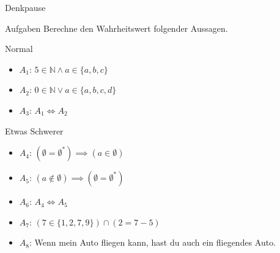 {
\begin{frame}[fragile]{Denkpause}
    \begin{alertblock}{Aufgaben}
      Berechne den Wahrheitswert folgender Aussagen. 
    \end{alertblock}
    \begin{block}{Normal}
    \begin{itemize}
        \item $A_1$: $5 \in \mathbb{N} \wedge a \in \{a, b, c\}$
        \item $A_2$: $0 \in \mathbb{N} \vee a \in \{a, b, c, d\}$
        \item $A_3$: $A_1 \iff A_2$
    \end{itemize}
    \end{block}
    \begin{block}{Etwas Schwerer}
    \begin{itemize}
        \item $A_4$: $(\emptyset=\emptyset^{*}) \implies (a \in \emptyset)$
        \item $A_5$: $(a \notin \emptyset) \implies (\emptyset = \emptyset^{*})$
        \item $A_6$: $A_4 \iff A_5$
        \item $A_7$: $(7 \in \{1, 2, 7, 9\}) \cap (2 = 7-5)$
        \item $A_8$: Wenn mein Auto fliegen kann, hast du auch ein fliegendes Auto.
    \end{itemize}
    \end{block}
\end{frame}
}

